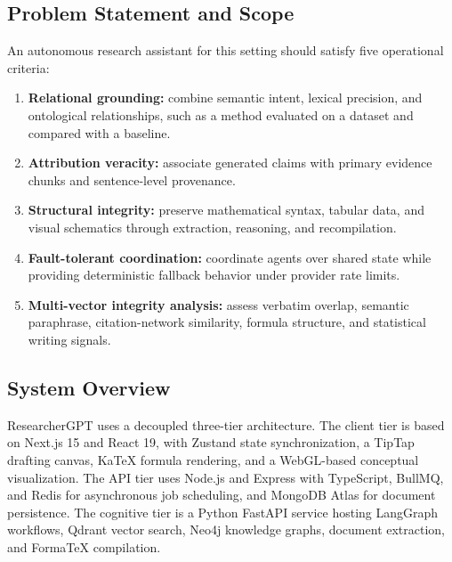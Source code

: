 \documentclass[conference]{IEEEtran}
\begin{document}
\subsection{Problem Statement and Scope}
An autonomous research assistant for this setting should satisfy five operational criteria:
\begin{enumerate}
\item \textbf{Relational grounding:} combine semantic intent, lexical precision, and ontological relationships, such as a method evaluated on a dataset and compared with a baseline.
\item \textbf{Attribution veracity:} associate generated claims with primary evidence chunks and sentence-level provenance.
\item \textbf{Structural integrity:} preserve mathematical syntax, tabular data, and visual schematics through extraction, reasoning, and recompilation.
\item \textbf{Fault-tolerant coordination:} coordinate agents over shared state while providing deterministic fallback behavior under provider rate limits.
\item \textbf{Multi-vector integrity analysis:} assess verbatim overlap, semantic paraphrase, citation-network similarity, formula structure, and statistical writing signals.
\end{enumerate}

\subsection{System Overview}
ResearcherGPT uses a decoupled three-tier architecture. The client tier is based on Next.js 15 and React 19, with Zustand state synchronization, a TipTap drafting canvas, KaTeX formula rendering, and a WebGL-based conceptual visualization. The API tier uses Node.js and Express with TypeScript, BullMQ, and Redis for asynchronous job scheduling, and MongoDB Atlas for document persistence. The cognitive tier is a Python FastAPI service hosting LangGraph workflows, Qdrant vector search, Neo4j knowledge graphs, document extraction, and FormaTeX compilation.
\end{document}
